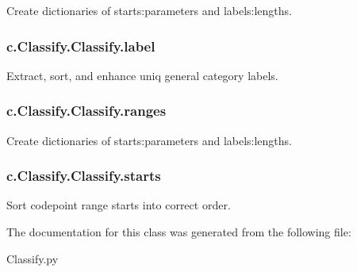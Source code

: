 Create dictionaries of starts\+:parameters and labels\+:lengths. 

\hypertarget{classc_1_1_classify_1_1_classify_a39504bd936bf5576befb10e0ac43d83f}{}
\subsubsection[{label}]{\setlength{\rightskip}{0pt plus 5cm}c.\+Classify.\+Classify.\+label}\label{classc_1_1_classify_1_1_classify_a39504bd936bf5576befb10e0ac43d83f}


Extract, sort, and enhance uniq general category labels. 

\hypertarget{classc_1_1_classify_1_1_classify_a1e4a9a02e19f108821677534f7e8d60a}{}
\subsubsection[{ranges}]{\setlength{\rightskip}{0pt plus 5cm}c.\+Classify.\+Classify.\+ranges}\label{classc_1_1_classify_1_1_classify_a1e4a9a02e19f108821677534f7e8d60a}


Create dictionaries of starts\+:parameters and labels\+:lengths. 

\hypertarget{classc_1_1_classify_1_1_classify_afdb329410c16ea92a7ac17476f576fde}{}
\subsubsection[{starts}]{\setlength{\rightskip}{0pt plus 5cm}c.\+Classify.\+Classify.\+starts}\label{classc_1_1_classify_1_1_classify_afdb329410c16ea92a7ac17476f576fde}


Sort codepoint range starts into correct order. 



The documentation for this class was generated from the following file\+:\begin{DoxyCompactItemize}
\item 
Classify.\+py\end{DoxyCompactItemize}

